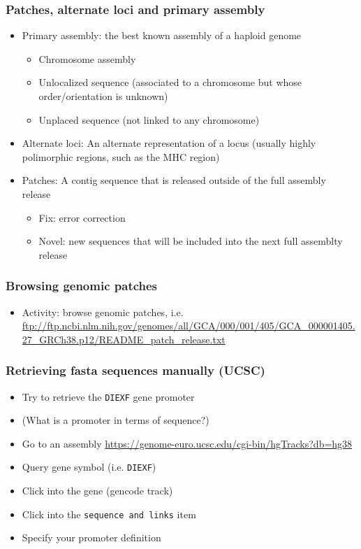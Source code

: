 \documentclass{beamer}
\begin{document}
\begin{frame}
  \frametitle{Patches, alternate loci and primary assembly}
  \begin{itemize}
  \item Primary assembly: the best known assembly of a haploid genome
    \begin{itemize}
    \item Chromosome assembly
    \item Unlocalized sequence (associated to a chromosome but whose order/orientation is unknown)
    \item Unplaced sequence (not linked to any chromosome)
    \end{itemize}
  \item  Alternate loci: An alternate representation of a locus (usually highly polimorphic regions, such as the MHC region)

  \item Patches: A contig sequence that is released outside of the full assembly release
    \begin{itemize}
    \item Fix: error correction
    \item Novel: new sequences that will be included into the next full assemblty release
    \end{itemize}
  \end{itemize}
\end{frame}


\begin{frame}
  \frametitle{Browsing genomic patches}
  \begin{itemize}
  \item Activity: browse genomic patches, i.e. \url{ftp://ftp.ncbi.nlm.nih.gov/genomes/all/GCA/000/001/405/GCA_000001405.27_GRCh38.p12/README_patch_release.txt}
  \end{itemize}
\end{frame}


\begin{frame}
  \frametitle{Retrieving fasta sequences manually (UCSC)}
\begin{itemize}
\item Try to retrieve the \texttt{DIEXF} gene promoter
\item (What is a promoter in terms of sequence?)
\item Go to an assembly \url{https://genome-euro.ucsc.edu/cgi-bin/hgTracks?db=hg38}
\item Query gene symbol (i.e. \texttt{DIEXF})
\item Click into the gene (gencode track)
\item Click into the \texttt{sequence and links} item
\item Specify your promoter definition

\end{itemize}

\end{frame}
\end{document}
